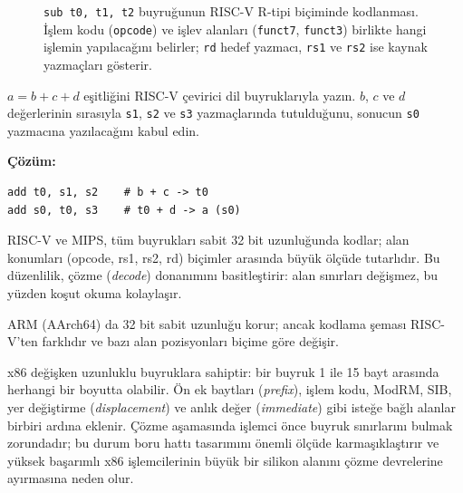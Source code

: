 \begin{figure}[H]
\caption[R-tipi buyruğun kodlanması]{\texttt{sub t0, t1, t2} buyruğunun RISC-V R-tipi biçiminde kodlanması. İşlem kodu (\texttt{opcode}) ve işlev alanları (\texttt{funct7}, \texttt{funct3}) birlikte hangi işlemin yapılacağını belirler; \texttt{rd} hedef yazmacı, \texttt{rs1} ve \texttt{rs2} ise kaynak yazmaçları gösterir.}
\label{fig:buyruk-bilesenleri}
\end{figure}

\begin{ornek}[3.1]
$a = b + c + d$ eşitliğini RISC-V çevirici dil buyruklarıyla yazın. $b$, $c$ ve $d$ değerlerinin sırasıyla \texttt{s1}, \texttt{s2} ve \texttt{s3} yazmaçlarında tutulduğunu, sonucun \texttt{s0} yazmacına yazılacağını kabul edin.

\textbf{Çözüm:}
\begin{lstlisting}[style=riscv]
add t0, s1, s2    # b + c -> t0
add s0, t0, s3    # t0 + d -> a (s0)
\end{lstlisting}
\end{ornek}

\begin{karsilastirma}
RISC-V ve MIPS, tüm buyrukları sabit 32 bit uzunluğunda kodlar; alan konumları (opcode, rs1, rs2, rd) biçimler arasında büyük ölçüde tutarlıdır. Bu düzenlilik, çözme (\emph{decode}) donanımını basitleştirir: alan sınırları değişmez, bu yüzden koşut okuma kolaylaşır.

ARM (AArch64) da 32 bit sabit uzunluğu korur; ancak kodlama şeması RISC-V'ten farklıdır ve bazı alan pozisyonları biçime göre değişir.

x86 değişken uzunluklu buyruklara sahiptir: bir buyruk 1 ile 15 bayt arasında herhangi bir boyutta olabilir. Ön ek baytları (\emph{prefix}), işlem kodu, ModRM, SIB, yer değiştirme (\emph{displacement}) ve anlık değer (\emph{immediate}) gibi isteğe bağlı alanlar birbiri ardına eklenir. Çözme aşamasında işlemci önce buyruk sınırlarını bulmak zorundadır; bu durum boru hattı tasarımını önemli ölçüde karmaşıklaştırır ve yüksek başarımlı x86 işlemcilerinin büyük bir silikon alanını çözme devrelerine ayırmasına neden olur.
\end{karsilastirma}

